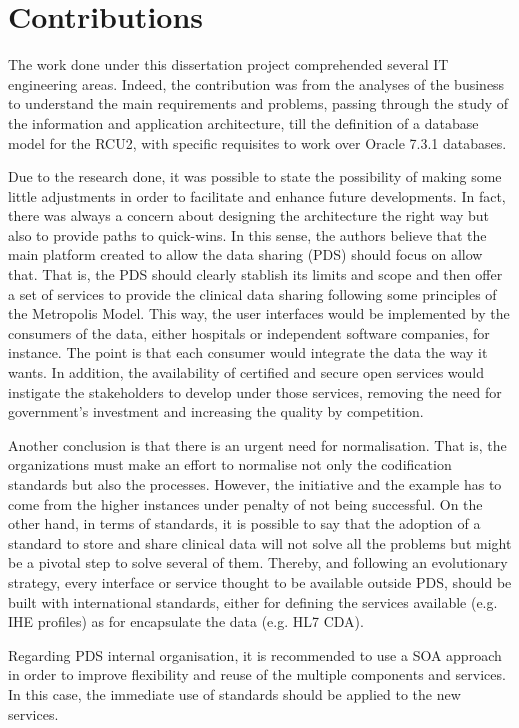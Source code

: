 \section{Contributions}

The work done under this dissertation project comprehended several IT engineering areas. Indeed, the contribution was from the analyses of the business to understand the main requirements and problems, passing through the study of the information and application architecture, till the definition of a database model for the RCU2, with specific requisites to work over Oracle 7.3.1 databases.

Due to the research done, it was possible to state the possibility of making some little adjustments in order to facilitate and enhance future developments. In fact, there was always a concern about designing the architecture the right way but also to provide paths to quick-wins. In this sense, the authors believe that the main platform created to allow the data sharing (PDS) should focus on allow that. That is, the PDS should clearly stablish its limits and scope and then offer a set of services to provide the clinical data sharing following some principles of the Metropolis Model. This way, the user interfaces would be implemented by the consumers of the data, either hospitals or independent software companies, for instance. The point is that each consumer would integrate the data the way it wants. In addition, the availability of certified and secure open services would instigate the stakeholders to develop under those services, removing the need for government's investment and increasing the quality by competition.

Another conclusion is that there is an urgent need for normalisation. That is, the organizations must make an effort to normalise not only the codification standards but also the processes. However, the initiative and the example has to come from the higher instances under penalty of not being successful. On the other hand, in terms of standards, it is possible to say that the adoption of a standard to store and share clinical data will not solve all the problems but might be a pivotal step to solve several of them. Thereby, and following an evolutionary strategy, every interface or service thought to be available outside PDS, should be built with international standards, either for defining the services available (e.g. IHE profiles) as for encapsulate the data (e.g. HL7 CDA).

Regarding PDS internal organisation, it is recommended to use a SOA approach in order to improve flexibility and reuse of the multiple components and services. In this case, the immediate use of standards should be applied to the new services.


